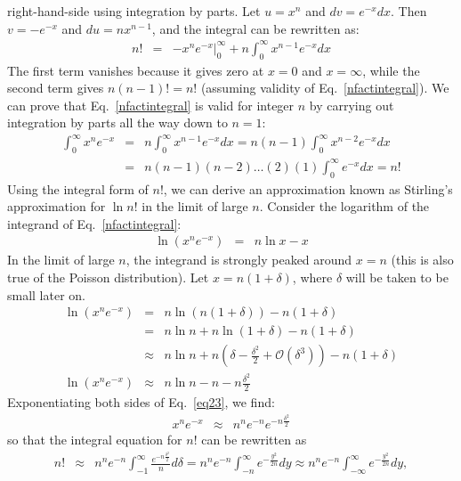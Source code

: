 \documentclass{revtex4}
\begin{document}
right-hand-side using integration by parts. Let $u = x^n$ and $dv =
e^{-x} dx$. Then $v = -e^{-x}$ and $du = nx^{n-1}$, and the integral can
be rewritten as: 
\begin{eqnarray}
  n! &=& \left. -x^n e^{-x}\right|_0^\infty + n \int_0^\infty x^{n-1}
  e^{-x} dx
\end{eqnarray}
The first term vanishes because it gives zero at $x=0$ and $x=\infty$, while the second term gives $n(n-1)! = n!$
(assuming validity of Eq.~\eqref{nfactintegral}). We can prove that
Eq.~\eqref{nfactintegral} is valid for integer $n$ by carrying out
integration by parts all the way down to $n=1$:
\begin{eqnarray}
  \int_0^\infty x^n e^{-x} &=& n \int_0^\infty x^{n-1}e^{-x} dx =
  n(n-1) \int_0^\infty x^{n-2}e^{-x}dx \nonumber \\
  &=& n(n-1)(n-2)\ldots(2)(1) \int_0^\infty e^{-x} dx = n!
\end{eqnarray}
Using the integral form of $n!$, we can derive an approximation known
as Stirling's approximation for $\ln n!$ in the limit of large
$n$. Consider the logarithm of the integrand of
Eq.~\eqref{nfactintegral}:
\begin{eqnarray}
  \ln \left(x^n e^{-x} \right) &=& n \ln x - x
\end{eqnarray}
In the limit of large $n$, the integrand is strongly peaked around $x
= n$ (this is also true of the Poisson distribution). Let $x = n(1+
\delta)$, where $\delta$ will be taken to be small later on.
\begin{eqnarray}
  \ln \left(x^n e^{-x} \right) &=& n \ln (n(1+\delta)) - n(1+\delta)
  \nonumber \\
  &=& n \ln n + n \ln (1+\delta) - n(1+\delta) \nonumber \\
  &\approx& n \ln n + n\left(\delta - \frac{\delta^2}{2} +
    \mathcal{O}\left(\delta^3\right)\right) -n(1+\delta) \nonumber \\
  \ln \left(x^n e^{-x} \right) &\approx & n \ln n - n - n
  \frac{\delta^2}{2} \label{eq23}
\end{eqnarray}
Exponentiating both sides of Eq.~\eqref{eq23}, we find:
\begin{eqnarray}
  x^n e^{-x} &\approx& n^ne^{-n} e^{-n\frac{\delta^2}{2}}
\end{eqnarray} 
so that the integral equation for $n!$ can be rewritten as
\begin{eqnarray}
  n! &\approx & n^ne^{-n} \int_{-1}^{\infty}
  \frac{e^{-n\frac{\delta^2}{2}}}{n} d\delta = n^n e^{-n}
  \int_{-n}^\infty e^{-\frac{y^2}{2n}} dy \approx n^n e^{-n}
  \int_{-\infty}^{\infty} e^{-\frac{y^2}{2n}} dy, \label{nfactapprox}
\end{eqnarray}
\end{document}
